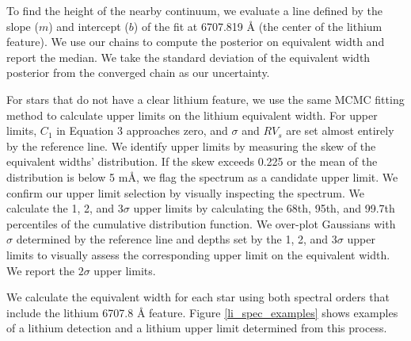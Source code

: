 To find the height of the nearby continuum, we evaluate a line defined by the slope ($m$) and intercept ($b$) of the fit at 6707.819 \r{A} (the center of the lithium feature). We use our chains to compute the posterior on equivalent width and report the median. We take the standard deviation of the equivalent width posterior from the converged chain as our uncertainty.


For stars that do not have a clear lithium feature, we use the same MCMC fitting method to calculate upper limits on the lithium equivalent width. For upper limits, $C_{1}$ in Equation 3 approaches zero, and $\sigma$ and $RV_{s}$ are set almost entirely by the reference line. We identify upper limits by measuring the skew of the equivalent widths' distribution. If the skew exceeds 0.225 or the mean of the distribution is below 5 m\r{A}, we flag the spectrum as a candidate upper limit. We confirm our upper limit selection by visually inspecting the spectrum. We calculate the 1, 2, and 3$\sigma$ upper limits by calculating the 68th, 95th, and 99.7th percentiles of the cumulative distribution function. We over-plot Gaussians with $\sigma$ determined by the reference line and depths set by the 1, 2, and 3$\sigma$ upper limits to visually assess the corresponding upper limit on the equivalent width. We report the $2\sigma$ upper limits.

We calculate the equivalent width for each star using both spectral orders that include the lithium 6707.8 \r{A} feature.  Figure \ref{li_spec_examples} shows examples of a lithium detection and a lithium upper limit determined from this process.



